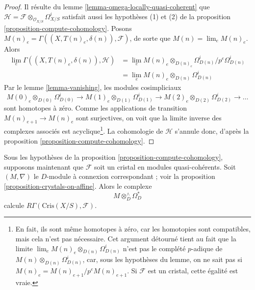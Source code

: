 \begin{proof}
Il résulte du lemme \ref{lemma-omega-locally-quasi-coherent} que
$\mathcal{H} = \mathcal{F} \otimes_{\mathcal{O}_{X/S}} \Omega^i_{X/S}$
satisfait aussi les hypothèses (1) et (2) de la
proposition \ref{proposition-compute-cohomology}.
Posons $M(n)_e = \Gamma((X, T(n)_e, \delta(n)), \mathcal{F})$,
de sorte que $M(n) = \lim_e M(n)_e$. Alors
\begin{align*}
\lim_e \Gamma((X, T(n)_e, \delta(n)), \mathcal{H}) & =
\lim_e M(n)_e \otimes_{D(n)_e} \Omega^i_{D(n)}/p^e\Omega^i_{D(n)} \\
& = \lim_e M(n)_e \otimes_{D(n)} \Omega^i_{D(n)}
\end{align*}
Par le
lemme \ref{lemma-vanishing},
les modules cosimpliciaux
$$
M(0)_e \otimes_{D(0)} \Omega^i_{D(0)} \to
M(1)_e \otimes_{D(1)} \Omega^i_{D(1)} \to
M(2)_e \otimes_{D(2)} \Omega^i_{D(2)} \to \ldots
$$
sont homotopes à zéro. Comme les applications de transition
$M(n)_{e + 1} \to M(n)_e$ sont surjectives, on voit que
la limite inverse des complexes associés est acyclique\footnote{En fait,
ils sont même homotopes à zéro, car les homotopies sont compatibles, mais cela n'est pas
nécessaire. Cet argument détourné tient au fait que
la limite $\lim_e M(n)_e \otimes_{D(n)} \Omega^i_{D(n)}$ n'est pas le
complété $p$-adique de $M(n) \otimes_{D(n)} \Omega^i_{D(n)}$, car, sous
les hypothèses du lemme, on ne sait pas si
$M(n)_e = M(n)_{e + 1}/p^eM(n)_{e + 1}$. Si $\mathcal{F}$ est un cristal,
cette égalité est vraie.}.
La cohomologie de $\mathcal{H}$ s'annule donc, d'après la
proposition \ref{proposition-compute-cohomology}.
\end{proof}

\begin{proposition}
\label{proposition-compute-cohomology-crystal}
Sous les hypothèses de la proposition \ref{proposition-compute-cohomology},
supposons maintenant que $\mathcal{F}$ soit un cristal en modules quasi-cohérents.
Soit $(M, \nabla)$ le $D$-module à connexion correspondant ; voir la
proposition \ref{proposition-crystals-on-affine}. Alors le complexe
$$
M \otimes^\wedge_D \Omega^*_D
$$
calcule $R\Gamma(\text{Cris}(X/S), \mathcal{F})$.
\end{proposition}

